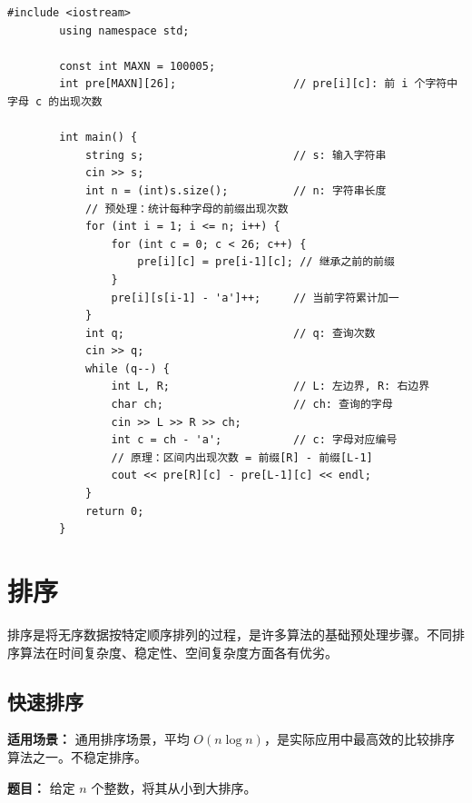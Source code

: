 \documentclass[12pt,a4paper]{ctexart}
\begin{document}
	\begin{lstlisting}[caption={前缀和——区间内字母出现次数}]
		#include <iostream>
		using namespace std;
		
		const int MAXN = 100005;
		int pre[MAXN][26];                  // pre[i][c]: 前 i 个字符中字母 c 的出现次数
		
		int main() {
			string s;                       // s: 输入字符串
			cin >> s;
			int n = (int)s.size();          // n: 字符串长度
			// 预处理：统计每种字母的前缀出现次数
			for (int i = 1; i <= n; i++) {
				for (int c = 0; c < 26; c++) {
					pre[i][c] = pre[i-1][c]; // 继承之前的前缀
				}
				pre[i][s[i-1] - 'a']++;     // 当前字符累计加一
			}
			int q;                          // q: 查询次数
			cin >> q;
			while (q--) {
				int L, R;                   // L: 左边界, R: 右边界
				char ch;                    // ch: 查询的字母
				cin >> L >> R >> ch;
				int c = ch - 'a';           // c: 字母对应编号
				// 原理：区间内出现次数 = 前缀[R] - 前缀[L-1]
				cout << pre[R][c] - pre[L-1][c] << endl;
			}
			return 0;
		}
	\end{lstlisting}
	
	\newpage
	
	\section{排序}
	排序是将无序数据按特定顺序排列的过程，是许多算法的基础预处理步骤。不同排序算法在时间复杂度、稳定性、空间复杂度方面各有优劣。
	
	\subsection{快速排序}
	\textbf{适用场景：} 通用排序场景，平均 $O(n\log n)$，是实际应用中最高效的比较排序算法之一。不稳定排序。
	
	\textbf{题目：} 给定 $n$ 个整数，将其从小到大排序。
	
\end{document}
